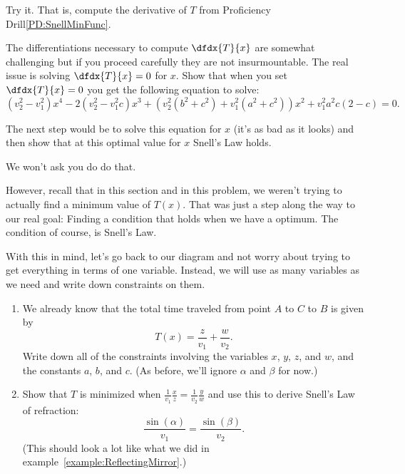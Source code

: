   \begin{embeddedproblem}
   Try it. That is, compute the derivative of $T$ from Proficiency
   Drill\ref{PD:SnellMinFunc}. 

   The differentiations necessary to compute $\dfdx{T}{x}$ are
   somewhat challenging but if you proceed carefully they are not
   insurmountable. The real issue is solving $\dfdx{T}{x}=0$ for
   $x$. Show that when you set $\dfdx{T}{x}=0$ you get the following
   equation to solve:
   $$
   (v_2^2-v_1^2)x^4-2(v_2^2-v_1^2c)x^3+\left(v_2^2(b^2+c^2)+v_1^2(a^2+c^2)\right)x^2+v_1^2a^2c(2-c)
   =0.
   $$

   The next step would be to solve this equation for $x$ (it's as bad as
   it looks) and then show that at this optimal value for $x$ Snell's
   Law holds.

   We won't ask you do do that.  
 \end{embeddedproblem}
 
    However, recall that in this section and in this problem, we
    weren't trying to actually find a minimum value of $T(x)$. That
    was just a step along the way to our real goal: Finding a
    condition 
    that holds when we have a optimum.   The
    condition of course, is Snell's Law.

    With this in mind, let's go back to
    our diagram and not worry about trying to get everything in terms
    of one variable.  Instead, we will use as many variables as we
    need and write down constraints on them.

    \begin{embeddedproblem-enumerate}
    \begin{enumerate}
    \item We already know that the total time traveled from point $A$  to $C$ to $B$ is given by
      $$
      T(x)=\frac{z}{v_1}+\frac{w}{v_2}.
      $$
      Write down all of the constraints involving  the variables $x$,
      $y$, $z$, and $w$, and the constants $a$, $b$, and $c$.  (As before, we'll ignore $\alpha$ and $\beta$ for now.)
    \item Show that $T$ is minimized when
      $\frac{1}{v_1}\frac{x}{z}=\frac{1}{v_2}\frac{y}{w}$ and use this
      to derive Snell's Law of refraction:
      $$
      \frac{\sin(\alpha)}{v_1}=\frac{\sin(\beta)}{v_2}.
      $$
 (This should look a lot like what we
      did in example~\ref{example:ReflectingMirror}.)
    \end{enumerate}
    \end{embeddedproblem-enumerate}


